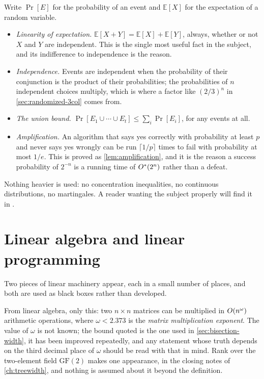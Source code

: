 Write $\Pr[E]$ for the probability of an event and $\mathbb{E}[X]$ for the
expectation of a random variable.
\begin{itemize}[leftmargin=*]
  \item \emph{Linearity of expectation.}
        $\mathbb{E}[X + Y] = \mathbb{E}[X] + \mathbb{E}[Y]$, always, whether or
        not $X$ and $Y$ are independent. This is the single most useful fact in
        the subject, and its indifference to independence is the reason.
  \item \emph{Independence.} Events are independent when the probability of
        their conjunction is the product of their probabilities; the
        probabilities of $n$ independent choices multiply, which is where a
        factor like $(2/3)^n$ in \cref{sec:randomized-3col} comes from.
  \item \emph{The union bound.} $\Pr[E_1 \cup \cdots \cup E_t] \le
        \sum_i \Pr[E_i]$, for any events at all.
  \item \emph{Amplification.} An algorithm that says yes correctly with
        probability at least $p$ and never says yes wrongly can be run
        $\lceil 1/p \rceil$ times to fail with probability at most $1/e$. This
        is proved as \cref{lem:amplification}, and it is the reason a success
        probability of $2^{-n}$ is a running time of $O^{*}(2^n)$ rather than
        a defeat.
\end{itemize}

Nothing heavier is used: no concentration inequalities, no continuous
distributions, no martingales. A reader wanting the subject properly will find
it in \citet{MitzenmacherUpfal2017}.

\section{Linear algebra and linear programming}
\label{sec:prelim-linear}

Two pieces of linear machinery appear, each in a small number of places, and
both are used as black boxes rather than developed.

From linear algebra, only this: two $n \times n$ matrices can be multiplied in
$O\!\left(n^{\omega}\right)$ arithmetic operations, where $\omega < 2.373$ is the
\emph{matrix multiplication exponent}. The value of $\omega$ is not known; the
bound quoted is the one used in \cref{sec:bisection-width}, it has been improved
repeatedly, and any statement whose truth depends on the third decimal place of
$\omega$ should be read with that in mind. Rank over the two-element field
$\mathrm{GF}(2)$ makes one appearance, in the closing notes of
\cref{ch:treewidth}, and nothing is assumed about it beyond the definition.

